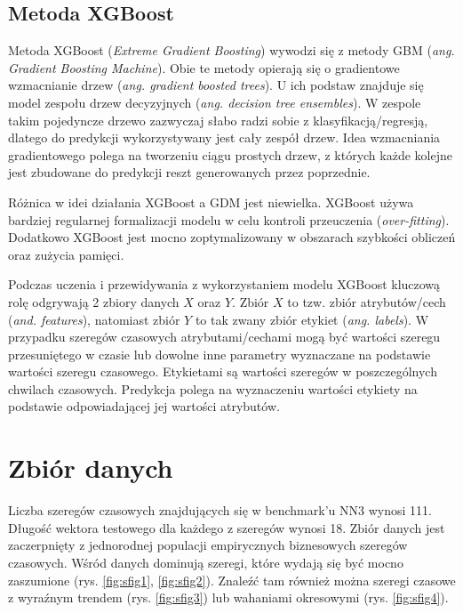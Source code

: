 \documentclass[11pt]{report}
\begin{document}
\subsection{Metoda XGBoost}
Metoda XGBoost (\textit{Extreme Gradient Boosting}) wywodzi się z metody GBM (\textit{ang. Gradient Boosting Machine}).
Obie te metody opierają się o gradientowe wzmacnianie drzew (\textit{ang. gradient boosted trees}).
U ich podstaw znajduje się model zespołu drzew decyzyjnych (\textit{ang. decision tree ensembles}).
W zespole takim pojedyncze drzewo zazwyczaj słabo radzi sobie z klasyfikacją/regresją, dlatego do predykcji wykorzystywany jest cały zespół drzew.
Idea wzmacniania gradientowego polega na tworzeniu ciągu prostych drzew, z których każde kolejne jest zbudowane do predykcji reszt generowanych przez poprzednie.

Różnica w idei działania XGBoost a GDM jest niewielka.
XGBoost używa bardziej regularnej formalizacji modelu w celu kontroli przeuczenia (\textit{over-fitting}).
Dodatkowo XGBoost jest mocno zoptymalizowany w obszarach szybkości obliczeń oraz zużycia pamięci.

Podczas uczenia i przewidywania z wykorzystaniem modelu XGBoost kluczową rolę odgrywają 2 zbiory danych $X$ oraz $Y$.
Zbiór $X$ to tzw. zbiór atrybutów/cech (\textit{and. features}), natomiast zbiór $Y$ to tak zwany zbiór etykiet (\textit{ang. labels}).
W przypadku szeregów czasowych atrybutami/cechami mogą być wartości szeregu przesuniętego w czasie lub dowolne inne parametry wyznaczane na podstawie wartości szeregu czasowego.
Etykietami są wartości szeregów w poszczególnych chwilach czasowych.
Predykcja polega na wyznaczeniu wartości etykiety na podstawie odpowiadającej jej wartości atrybutów.

\section{Zbiór danych}
Liczba szeregów czasowych znajdujących się w benchmark'u NN3 wynosi 111.
Długość wektora testowego dla każdego z szeregów wynosi 18.
Zbiór danych jest zaczerpnięty z jednorodnej populacji empirycznych biznesowych szeregów czasowych.
Wśród danych dominują szeregi, które wydają się być mocno zaszumione (rys. \ref{fig:sfig1}, \ref{fig:sfig2}).
Znaleźć tam również można szeregi czasowe z wyraźnym trendem (rys. \ref{fig:sfig3}) lub wahaniami okresowymi (rys. \ref{fig:sfig4}).
\end{document}
